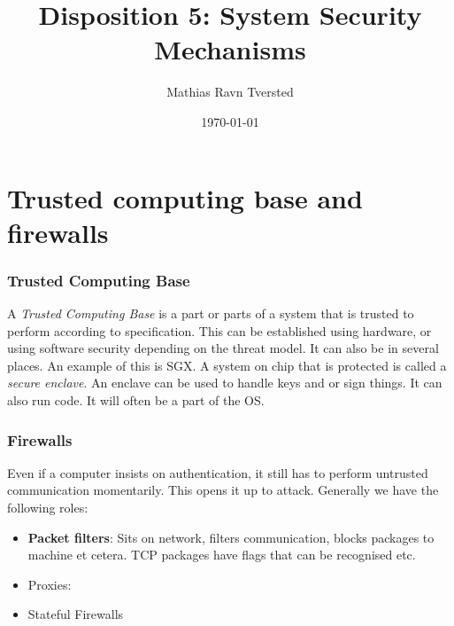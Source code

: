 
\title{Disposition 5: System Security Mechanisms}   
\author{Mathias Ravn Tversted} 
\date{\today} 











\frame{\titlepage} 




\section{Trusted computing base and firewalls}

\begin{frame}
    \frametitle{Trusted Computing Base}
        A \textit{Trusted Computing Base} is a part or parts of a system that is trusted to perform according to specification. This can be established using hardware, or using software security depending on the threat model. It can also be in several places. An example of this is SGX. A system on chip that is protected is called a \textit{secure enclave}. An enclave can be used to handle keys and or sign things. It can also run code. It will often be a part of the OS. 
\end{frame}


\begin{frame}
    \frametitle{Firewalls}
        Even if a computer insists on authentication, it still has to perform untrusted communication momentarily. This opens it up to attack. Generally we have the following roles:
        \begin{itemize}
            \item \textbf{Packet filters}: Sits on network, filters communication, blocks packages to machine et cetera. TCP packages have flags that can be recognised etc.
            \item Proxies: 
            \item Stateful Firewalls
        \end{itemize}
\end{frame}

